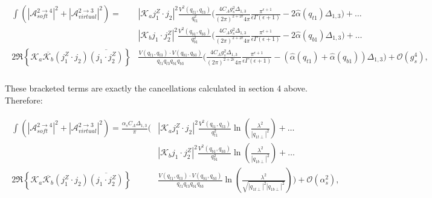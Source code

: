 		\begin{align}
		\begin{split}
			\int\left(|\mathcal{A}^{2\rightarrow4}_{soft}|^2 + |\mathcal{A}^{2\rightarrow3}_{virtual}|^2\right) =
			&|\mathcal{K}_aj_1^Z\cdot j_2|^2 \frac{V^2(q_{t1}, q_{t3})}{q_{t1}^2}
			{\Bigg(\frac{4C_Ag_s^2\Delta_{1,3}}{(2\pi)^{2+2\epsilon}4\pi}\frac{\pi^{\epsilon+1}}
			{\epsilon\Gamma(\epsilon+1)} - 2\hat{\alpha}(q_{t1})\Delta_{1,3}\Bigg)}+\ldots \\
			& |\mathcal{K}_bj_1\cdot j_2^Z|^2 \frac{V^2(q_{b1}, q_{b3})}{q_{b1}^2}
			{\Bigg(\frac{4C_Ag_s^2\Delta_{1,3}}{(2\pi)^{2+2\epsilon}4\pi}\frac{\pi^{\epsilon+1}}
			{\epsilon\Gamma(\epsilon+1)} - 2\hat{\alpha}(q_{b1})\Delta_{1,3}\Bigg)}+\ldots \\
			2\Re\left\{\mathcal{K}_a\overline{\mathcal{K}_b}  (j_1^Z\cdot j_2)\overline{(j_1\cdot j_2^Z)}\right\}&
			\frac{V(q_{t1}, q_{t3})\cdot V(q_{b1}, q_{b3})}{q_{t1}q_{t3}q_{b1}q_{b3}}{\Bigg(\frac{4C_Ag_s^2\Delta_{1,3}}
			{(2\pi)^{2+2\epsilon}4\pi}\frac{\pi^{\epsilon+1}}{\epsilon\Gamma(\epsilon+1)} -
			(\hat{\alpha}(q_{t1}) + \hat{\alpha}(q_{b1}))\Delta_{1,3}\Bigg)} + \mathcal{O}(g_s^4),\\
		\end{split}
		\end{align}

		These bracketed terms are exactly the cancellations calculated in section 4 above.  Therefore:

		\begin{align}
		\begin{split}
			\int\left(|\mathcal{A}^{2\rightarrow4}_{soft}|^2 + |\mathcal{A}^{2\rightarrow3}_{virtual}|^2\right) =
			\frac{\alpha_sC_A\Delta_{1,3}}{\pi}\Bigg(&|\mathcal{K}_aj_1^Z\cdot j_2|^2 \frac{V^2(q_{t1},
			q_{t3})}{q_{t1}^2}\ln\left(\frac{\lambda^2}{|q_{1t\perp}|^2}\right)+\ldots \\
			& |\mathcal{K}_bj_1\cdot j_2^Z|^2 \frac{V^2(q_{b1}, q_{b3})}{q_{b1}^2}\ln
			\left(\frac{\lambda^2}{|q_{1b\perp}|^2}\right)+\ldots \\
			2\Re\left\{\mathcal{K}_a\overline{\mathcal{K}_b}  (j_1^Z\cdot j_2)\overline{(j_1\cdot j_2^Z)}\right\}
			&\frac{V(q_{t1}, q_{t3})\cdot V(q_{b1}, q_{b3})}{q_{t1}q_{t3}q_{b1}q_{b3}}\ln
			\left(\frac{\lambda^2}{\sqrt{|q_{1t\perp}|^2|q_{1b\perp}|^2}}\right)\Bigg) + \mathcal{O}(\alpha_s^2),\\
		\end{split}
		\end{align}

